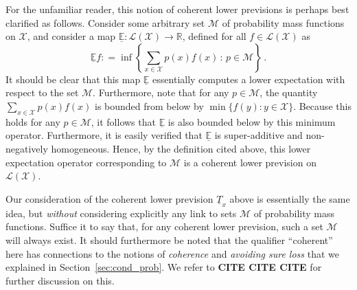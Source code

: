 \documentclass[10pt,a4paper]{paper}
\theoremstyle{definition}
\newcommand{\reals}{\mathbb{R}}
\newcommand{\states}{\mathcal{X}}
\newcommand{\lt}{\underline{T}}
\newcommand{\gambles}{\mathcal{L}}
\newcommand{\gamblesX}{\gambles(\states)}
\newcommand{\coloneqq}{:\!=}
\begin{document}
For the unfamiliar reader, this notion of coherent lower previsions is perhaps best clarified as follows. Consider some arbitrary set $\mathcal{M}$ of probability mass functions on $\states$, and consider a map $\underline{\mathbb{E}}:\gamblesX\to\reals$, defined for all $f\in\gamblesX$ as
\begin{equation*}
\underline{\mathbb{E}}f \coloneqq \inf\left\{\sum_{x\in\states} p(x)f(x)\,:\,p\in\mathcal{M}\right\}\,.
\end{equation*}
It should be clear that this map $\underline{\mathbb{E}}$ essentially computes a lower expectation with respect to the set $\mathcal{M}$. Furthermore, note that for any $p\in\mathcal{M}$, the quantity $\sum_{x\in\states}p(x)f(x)$ is bounded from below by $\min\{f(y):y\in\states\}$. Because this holds for any $p\in\mathcal{M}$, it follows that $\underline{\mathbb{E}}$ is also bounded below by this minimum operator. Furthermore, it is easily verified that $\underline{\mathbb{E}}$ is super-additive and non-negatively homogeneous. Hence, by the definition cited above, this lower expectation operator corresponding to $\mathcal{M}$ is a coherent lower prevision on $\gamblesX$. 

Our consideration of the coherent lower prevision $\lt_x$  above is essentially the same idea, but \emph{without} considering explicitly any link to sets $\mathcal{M}$ of probability mass functions. Suffice it to say that, for any coherent lower prevision, such a set $\mathcal{M}$ will always exist. It should furthermore be noted that the qualifier ``coherent'' here has connections to the notions of \emph{coherence} and \emph{avoiding sure loss} that we explained in Section~\ref{sec:cond_prob}. We refer to {\bf CITE CITE CITE} for further discussion on this.
\end{document}
